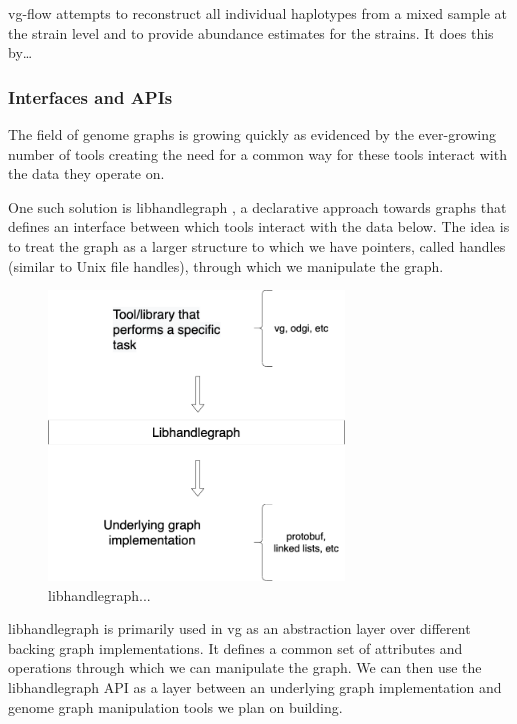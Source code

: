 \documentclass[10pt, a4paper]{article}
\begin{document}
vg-flow \cite{baaijensStrainawareAssemblyGenomes2020} attempts to reconstruct all
individual haplotypes from a mixed sample at the strain level and to provide
abundance estimates for the strains. It does this by\ldots{}

\subsubsection{Interfaces and APIs}
\label{sec:org02a6bd0}
The field of genome graphs is growing quickly as evidenced by the ever-growing
number of tools creating the need for a common way for these tools interact with
the data they operate on.

One such solution is libhandlegraph \cite{eizengaSuccinctDynamicVariation2020}, a
declarative approach towards graphs that defines an interface between which
tools interact with the data below.
The idea is to treat the graph as a larger structure to which we have pointers,
called handles (similar to  Unix file handles), through which we manipulate the
graph.

\begin{figure}[h]
\centering
\includegraphics[width=0.7\textwidth]{figures/libhandlegraph.png}
\caption{libhandlegraph...}
\end{figure}

libhandlegraph is primarily used in vg as an abstraction layer over different
backing graph implementations.
It defines a common set of attributes and operations through which we can
manipulate the graph. We can then use the libhandlegraph API as a layer between
an underlying graph implementation and genome graph manipulation tools we plan
on building.
\end{document}
